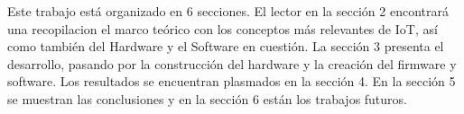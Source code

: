  Este trabajo está organizado en 6 secciones. El lector en la sección 2 encontrará una recopilacion el marco teórico con los conceptos más relevantes de IoT, así como también del Hardware y el Software en cuestión. La sección 3 presenta el desarrollo, pasando por la construcción del hardware y la creación del firmware y software. Los resultados se encuentran plasmados en la sección 4. En la sección 5 se muestran las conclusiones y en la sección 6 están los trabajos futuros.\\
 
 
